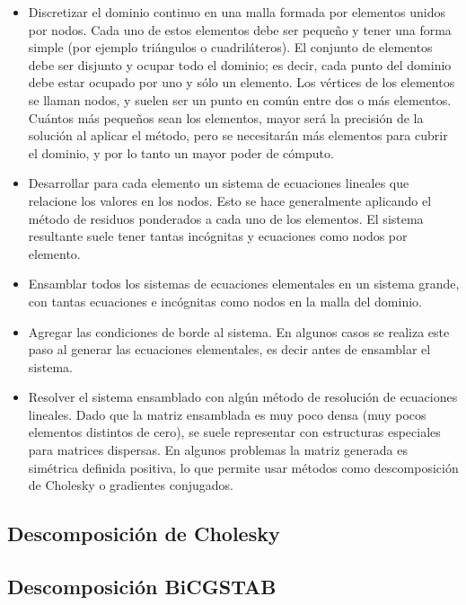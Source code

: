 \begin{itemize}
	\item Discretizar el dominio continuo en una malla formada por elementos unidos por nodos. Cada uno de estos elementos debe ser pequeño y tener una forma simple (por ejemplo triángulos o cuadriláteros). El conjunto de elementos debe ser disjunto y ocupar todo el dominio; es decir, cada punto del dominio debe estar ocupado por uno y sólo un elemento. Los vértices de los elementos se llaman nodos, y suelen ser un punto en común entre dos o más elementos. Cuántos más pequeños sean los elementos, mayor será la precisión de la solución al aplicar el método, pero se necesitarán más elementos para cubrir el dominio, y por lo tanto un mayor poder de cómputo. 
	
	\item Desarrollar para cada elemento un sistema de ecuaciones lineales que relacione los valores en los nodos. Esto se hace generalmente aplicando el método de residuos ponderados a cada uno de los elementos. El sistema resultante suele tener tantas incógnitas y ecuaciones como nodos por elemento.
		
	\item Ensamblar todos los sistemas de ecuaciones elementales en un sistema grande, con tantas ecuaciones e incógnitas como nodos en la malla del dominio. 
	
	\item Agregar las condiciones de borde al sistema. En algunos casos se realiza este paso al generar las ecuaciones elementales, es decir antes de ensamblar el sistema.
	
	\item Resolver el sistema ensamblado con algún método de resolución de ecuaciones lineales. Dado que la matriz ensamblada es muy poco densa (muy pocos elementos distintos de cero), se suele representar con estructuras especiales para matrices dispersas. En algunos problemas la matriz generada es simétrica definida positiva, lo que permite usar métodos como descomposición de Cholesky o gradientes conjugados.
\end{itemize}


\subsection{Descomposición de Cholesky}

\subsection{Descomposición BiCGSTAB}
